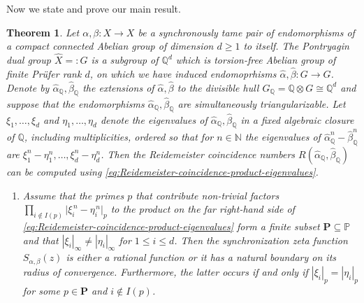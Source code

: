 \documentclass[oneside]{amsart}
\def\N{\mathbb{N}}
\def\Q{\mathbb{Q}}
\newtheorem{thm}{Theorem}
\begin{document}
Now we state and prove our main result.

\begin{thm} \label{thm:synchronization-dichotomy}
  Let $\alpha, \beta: X \to X$ be a synchronously tame pair of endomorphisms
  of a compact connected Abelian group of dimension $d \geq 1$ to itself.
  The Pontryagin dual group $\widehat{X} =: G$ is a subgroup of $\Q^d$
  which is torsion-free Abelian group of finite Pr\"ufer rank $d$,
  on which we have induced endomoprhisms $\widehat{\alpha}, \widehat{\beta}: G \to G$.
  Denote by $\widehat{\alpha}_\Q, \widehat{\beta}_\Q$ the extensions of $\widehat{\alpha}, \widehat{\beta}$
  to the divisible hull $G_\Q = \Q \otimes G \cong \Q^d$ and suppose that the endomorphisms
  $\widehat{\alpha}_\Q, \widehat{\beta}_\Q$ are simultaneously triangularizable.
  Let $\xi_1, \dots, \xi_d$ and $\eta_1, \dots, \eta_d$ denote the eigenvalues
  of $\widehat{\alpha}_\Q, \widehat{\beta}_\Q$ in a fixed algebraic closure of $\Q$,
  including multiplicities, ordered so that for $n \in \N$ the eigenvalues of
  $\widehat{\alpha}_\Q^n - \widehat{\beta}_\Q^n$ are $\xi_1^n - \eta_1^n, \dots, \xi_d^n - \eta_d^n$.
  Then the Reidemeister coincidence numbers $R(\widehat{\alpha}_\Q, \widehat{\beta}_\Q)$
  can be computed using \eqref{eq:Reidemeister-coincidence-product-eigenvalues}.

  \begin{enumerate}
    \item[\rm (i)] Assume that the primes $p$ that contribute non-trivial factors
      $\prod_{i \not \in I(p)} \lvert \xi_i^{\, n} - \eta_i^{\, n} \rvert_p$
      to the product on the far right-hand side of \eqref{eq:Reidemeister-coincidence-product-eigenvalues}
      form a finite subset $\mathbf{P} \subseteq \mathbb{P}$ and that
      $|\xi_i|_\infty \neq |\eta_i|_\infty$ for $1 \leq i \leq d$.
      Then the synchronization zeta function $S_{\alpha, \beta}(z)$  is either a rational function or it has a natural boundary on its radius of convergence.
      Furthermore, the latter occurs if and only if $|\xi_i|_p = |\eta_i|_p$ for some
      $p \in \mathbf{P}$ and $i \notin I(p)$.


\end{enumerate}
\end{thm}
\end{document}
